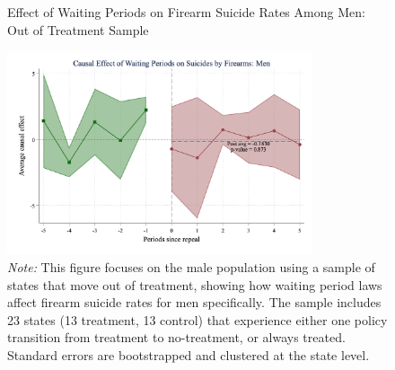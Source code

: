 \begin{figure}[htbp]
    \centering
    \caption{Effect of Waiting Periods on Firearm Suicide Rates Among Men: Out of Treatment Sample}
    \label{fig:firearm_suicide_DID_men-out}
    \includegraphics[width=0.8\textwidth]{figures/1009-csid-men-outsample-fire.png}
    \begin{minipage}{\linewidth}
    \caption*{\footnotesize{
      \noindent\textit{Note:} This figure focuses on the male population using a sample of states that move out of treatment, showing how waiting period laws affect firearm suicide rates for men specifically. The sample includes 23 states (13 treatment, 13 control) that experience either one policy transition from treatment to no-treatment, or always treated. Standard errors are bootstrapped and clustered at the state level. 
    }}
  \end{minipage}
\end{figure}

\pagebreak
\clearpage

